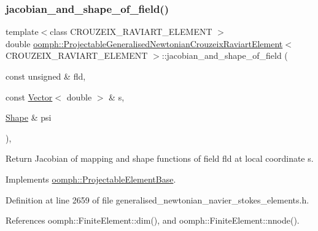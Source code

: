 \subsubsection{\texorpdfstring{jacobian\+\_\+and\+\_\+shape\+\_\+of\+\_\+field()}{jacobian\_and\_shape\_of\_field()}}
{\footnotesize\ttfamily template$<$class C\+R\+O\+U\+Z\+E\+I\+X\+\_\+\+R\+A\+V\+I\+A\+R\+T\+\_\+\+E\+L\+E\+M\+E\+NT $>$ \\
double \hyperlink{classoomph_1_1ProjectableGeneralisedNewtonianCrouzeixRaviartElement}{oomph\+::\+Projectable\+Generalised\+Newtonian\+Crouzeix\+Raviart\+Element}$<$ C\+R\+O\+U\+Z\+E\+I\+X\+\_\+\+R\+A\+V\+I\+A\+R\+T\+\_\+\+E\+L\+E\+M\+E\+NT $>$\+::jacobian\+\_\+and\+\_\+shape\+\_\+of\+\_\+field (\begin{DoxyParamCaption}\item[{const unsigned \&}]{fld,  }\item[{const \hyperlink{classoomph_1_1Vector}{Vector}$<$ double $>$ \&}]{s,  }\item[{\hyperlink{classoomph_1_1Shape}{Shape} \&}]{psi }\end{DoxyParamCaption})\hspace{0.3cm}{\ttfamily [inline]}, {\ttfamily [virtual]}}



Return Jacobian of mapping and shape functions of field fld at local coordinate s. 



Implements \hyperlink{classoomph_1_1ProjectableElementBase_ad45c21b58c0985d52f68ab2d79cbb488}{oomph\+::\+Projectable\+Element\+Base}.



Definition at line 2659 of file generalised\+\_\+newtonian\+\_\+navier\+\_\+stokes\+\_\+elements.\+h.



References oomph\+::\+Finite\+Element\+::dim(), and oomph\+::\+Finite\+Element\+::nnode().

\mbox{\label{classoomph_1_1ProjectableGeneralisedNewtonianCrouzeixRaviartElement_a3bc031a4608afe535d89c3ab1b611b10}} 
